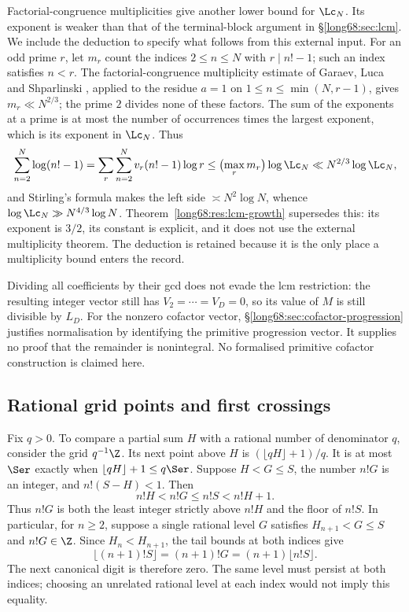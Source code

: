 Factorial-congruence multiplicities give another lower bound for
$\Lc_N$. Its exponent is weaker than that of the terminal-block
argument in \S\ref{long68:sec:lcm}. We include the deduction to specify
what follows from this external input.
For an odd prime $r$, let $m_r$ count the
indices $2\le n\le N$ with $r\mid n!-1$; such an index satisfies $n<r$.  The
factorial-congruence multiplicity estimate of Garaev, Luca and Shparlinski
\cite[arXiv v1, Thm.~12, p.~16]{garaev-luca-shparlinski}, applied to the
residue $a=1$ on $1\le n\le\min(N,r-1)$, gives $m_r\ll N^{2/3}$; the prime $2$
divides none of
these factors. The sum of the exponents at a prime is at most the number
of occurrences times the largest exponent, which is its exponent in
$\Lc_N$. Thus
\[
 \sum_{n=2}^{N}\log(n!-1)=\sum_r\sum_{n=2}^{N}v_r(n!-1)\log r
 \le\bigl(\max_r m_r\bigr)\log\Lc_N
 \ll N^{2/3}\log \Lc_N ,
\]
and Stirling's formula makes the left side $\asymp N^2\log N$, whence
$\log \Lc_N\gg N^{4/3}\log N$.  Theorem~\ref{long68:res:lcm-growth} supersedes this:
its exponent is $3/2$, its constant is explicit, and it does not use the
external multiplicity theorem.  The deduction is retained because it is the only place a
multiplicity bound enters the record.

Dividing all coefficients by their gcd does not evade the lcm restriction:
the resulting integer vector still has $V_2=\cdots=V_D=0$, so its value of $M$
is still divisible by $L_D$. For the nonzero cofactor vector,
\S\ref{long68:sec:cofactor-progression} justifies normalisation by
identifying the primitive progression vector. It supplies no proof that the remainder is
nonintegral. No formalised primitive cofactor construction is claimed here.

\subsection{Rational grid points and first crossings}
\label{long68:sec:ext-plateau}

Fix $q>0$. To compare a partial sum $H$ with a rational number of
denominator $q$, consider the grid $q^{-1}\Z$. Its next point above $H$
is $(\lfloor qH\rfloor+1)/q$. It is at most $\Ser$ exactly when
$\lfloor qH\rfloor+1\le q\Ser$.  Suppose $H<G\le S$, the number $n!G$ is an integer, and
$n!(S-H)<1$. Then
\[
 n!H<n!G\le n!S<n!H+1.
\]
Thus $n!G$ is both the least integer strictly above $n!H$ and the floor of
$n!S$. In particular, for $n\ge2$, suppose a single rational level $G$
satisfies $H_{n+1}<G\le S$ and $n!G\in\Z$. Since $H_n<H_{n+1}$,
the tail bounds at both indices give
\[
 \lfloor(n+1)!S\rfloor=(n+1)!G
   =(n+1)\lfloor n!S\rfloor.
\]
The next canonical digit is therefore zero. The same level must persist
at both indices; choosing an unrelated rational level at each index
would not imply this equality.

